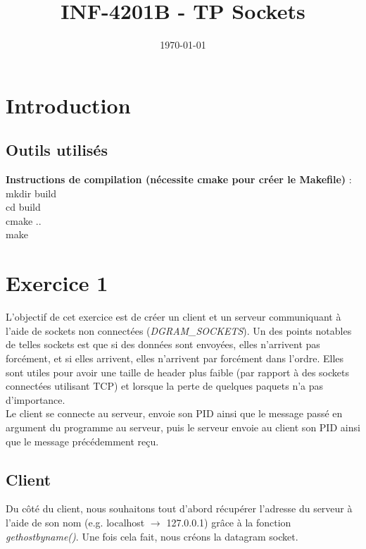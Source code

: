 \documentclass[a4paper, frenchb, 11pt]{article}
\title{
	\textbf{INF-4201B - TP Sockets}\\
}
\date{\today}
\begin{document}
\maketitle
\newpage

\tableofcontents
\newpage

\section{Introduction}

\subsection{Outils utilisés}

\begin{mdframed}[backgroundcolor=lightblue, linecolor=darkblue]
	\textbf{Instructions de compilation (nécessite cmake pour créer le Makefile)} :\\
	mkdir build\\
	cd build\\
	cmake ..\\
	make
\end{mdframed}
\newpage

\section{Exercice 1}
L'objectif de cet exercice est de créer un client et un serveur communiquant à l'aide de sockets non connectées (\emph{DGRAM\_SOCKETS}). Un des points notables de telles sockets est que si des données sont envoyées, elles n'arrivent pas forcément, et si elles arrivent, elles n'arrivent par forcément dans l'ordre. Elles sont utiles pour avoir une taille de header plus faible (par rapport à des sockets connectées utilisant TCP) et lorsque la perte de quelques paquets n'a pas d'importance.\\ %

Le client se connecte au serveur, envoie son PID ainsi que le message passé en argument du programme au serveur, puis le serveur envoie au client son PID ainsi que le message précédemment reçu.

\subsection{Client}
Du côté du client, nous souhaitons tout d'abord récupérer l'adresse du serveur à l'aide de son nom (e.g. localhost $\rightarrow$ 127.0.0.1) grâce à la fonction \emph{gethostbyname()}. Une fois cela fait, nous créons la datagram socket.\\
\end{document}
